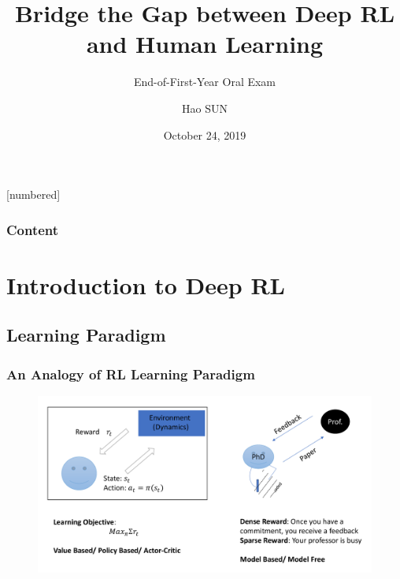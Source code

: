 \documentclass[10pt,hyperref={CJKbookmarks=true},envcountsect,mathserif]{beamer}
\begin{document}
[numbered]
\newcommand{\myarray}[2]{$#1_1,#1_2,\dots,#1_#2$}




\title{Bridge the Gap between Deep RL and Human Learning}
\subtitle{End-of-First-Year Oral Exam}
\author[Hao SUN]{Hao SUN\inst{*}}



\date{October 24, 2019}

\begin{frame}
\titlepage
\end{frame}

\begin{frame}
\frametitle{Content}
\tableofcontents	
\end{frame}



\section{Introduction to Deep RL}
\subsection{Learning Paradigm}
\begin{frame}
\frametitle{An Analogy of RL Learning Paradigm}	
\begin{figure}
\centering
\includegraphics[width=1.0\linewidth]{figures/Prof.pdf}
\end{figure}
\end{frame}
\end{document}
